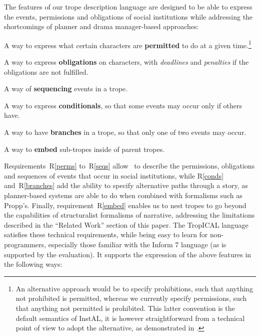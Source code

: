 The features of our trope description language are designed to be able to express the events, permissions and obligations of social institutions while addressing the shortcomings of planner and drama manager-based approaches:

\begin{compactenum}[R1.]
\item\label{perms} A way to express what certain characters are \textbf{permitted} to do at a given time.\footnote{An alternative approach would be to specify prohibitions, such that anything not prohibited is permitted, whereas we currently specify permissions, such that anything not permitted is prohibited.  This latter convention is the default semantics of InstAL, it is however straightforward from a technical point of view to adopt the alternative, as demonstrated in \cite{DBLP:conf/atal/KingLVDJPR15}.}
\item\label{obls} A way to express \textbf{obligations} on characters, with \emph{deadlines} and \emph{penalties} if the obligations are not fulfilled.
\item\label{seqs} A way of \textbf{sequencing} events in a trope.
\item\label{conds} A way to express \textbf{conditionals}, so that some events may occur only if others have.
\item\label{branches} A way to have \textbf{branches} in a trope, so that only one of two events may occur.
\item\label{embed} A way to \textbf{embed} sub-tropes inside of parent tropes.
\end{compactenum}
Requirements~R\ref{perms} to~R\ref{seqs} allow \tropical\ to describe the permissions, obligations and sequences of events that occur in social institutions, while R\ref{conds} and~R\ref{branches} add the ability to specify alternative paths through a story, as planner-based systems are able to do when combined with formalisms such as Propp's. Finally, requirement~R\ref{embed} enables us to nest tropes to go beyond the capabilities of structuralist formalisms of narrative, addressing the limitations described in the ``Related Work'' section of this paper. The TropICAL language satisfies these technical requirements, while being easy to learn for non-programmers, especially those familiar with the Inform 7 language (as is supported by the evaluation). It supports the expression of the above features in the following ways: 


